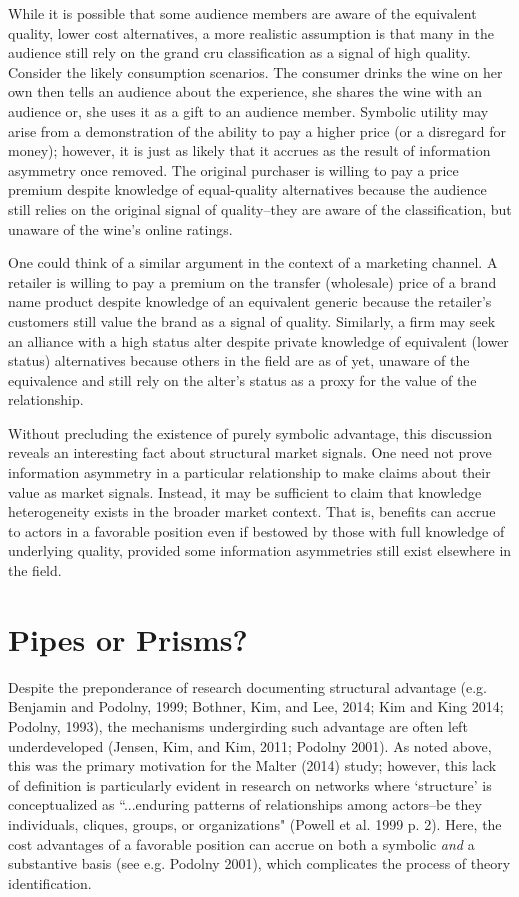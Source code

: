 While it is possible that some audience members are aware of the equivalent quality, lower cost alternatives, a more realistic assumption is that many in the audience still rely on the grand cru classification as a signal of high quality. Consider the likely consumption scenarios. The consumer drinks the wine on her own then tells an audience about the experience, she shares the wine with an audience or, she uses it as a gift to an audience member. Symbolic utility may arise from a demonstration of the ability to pay a higher price (or a disregard for money); however, it is just as likely that it accrues as the result of information asymmetry once removed. The original purchaser is willing to pay a price premium despite knowledge of equal-quality alternatives because the audience still relies on the original signal of quality--they are aware of the classification, but unaware of the wine's online ratings. 

One could think of a similar argument in the context of a marketing channel. A retailer is willing to pay a premium on the transfer (wholesale) price of a brand name product despite knowledge of an equivalent generic because the retailer's customers still value the brand as a signal of quality. Similarly, a firm may seek an alliance with a high status alter despite private knowledge of equivalent (lower status) alternatives because others in the field are as of yet, unaware of the equivalence and still rely on the alter's status as a proxy for the value of the relationship.  

Without precluding the existence of purely symbolic advantage, this discussion reveals an interesting fact about structural market signals. One need not prove information asymmetry in a particular relationship to make claims about their value as market signals. Instead, it may be sufficient to claim that knowledge heterogeneity exists in the broader market context. That is, benefits can accrue to actors in a favorable position even if bestowed by those with full knowledge of underlying quality, provided some information asymmetries still exist elsewhere in the field. 

\section{Pipes or Prisms?}

Despite the preponderance of research documenting structural advantage (e.g. Benjamin and Podolny, 1999; Bothner, Kim, and Lee, 2014; Kim and King 2014; Podolny, 1993), the mechanisms undergirding such advantage are often left underdeveloped (Jensen, Kim, and Kim, 2011; Podolny 2001). As noted above, this was the primary motivation for the Malter (2014) study; however, this lack of definition is particularly evident in research on networks where `structure' is conceptualized as ``...enduring patterns of relationships among actors--be they individuals, cliques, groups, or organizations" (Powell et al. 1999 p. 2). Here, the cost advantages of a favorable position can accrue on both a symbolic \emph{and} a substantive basis (see e.g. Podolny 2001), which complicates the process of theory identification.

